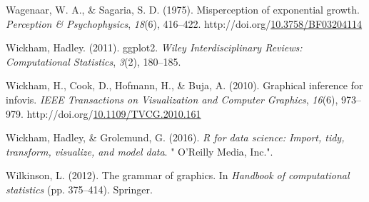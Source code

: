 \documentclass[print]{nuthesis}
\newlength{\cslhangindent}
\newenvironment{CSLReferences}%
{\setlength{\parindent}{0pt}%
\everypar{\setlength{\hangindent}{\cslhangindent}}\ignorespaces}%
{\par}
\begin{document}
\begin{CSLReferences}{1}{0}
\leavevmode\hypertarget{ref-wagenaar_misperception_1975}{}%
Wagenaar, W. A., \& Sagaria, S. D. (1975). Misperception of exponential growth. \emph{Perception \& Psychophysics}, \emph{18}(6), 416--422. http://doi.org/\href{https://doi.org/10.3758/BF03204114}{10.3758/BF03204114}

\leavevmode\hypertarget{ref-wickham2011ggplot2}{}%
Wickham, Hadley. (2011). ggplot2. \emph{Wiley Interdisciplinary Reviews: Computational Statistics}, \emph{3}(2), 180--185.

\leavevmode\hypertarget{ref-wickham_graphical_2010}{}%
Wickham, H., Cook, D., Hofmann, H., \& Buja, A. (2010). Graphical inference for infovis. \emph{IEEE Transactions on Visualization and Computer Graphics}, \emph{16}(6), 973--979. http://doi.org/\href{https://doi.org/10.1109/TVCG.2010.161}{10.1109/TVCG.2010.161}

\leavevmode\hypertarget{ref-wickham2016r}{}%
Wickham, Hadley, \& Grolemund, G. (2016). \emph{R for data science: Import, tidy, transform, visualize, and model data}. " O'Reilly Media, Inc.".

\leavevmode\hypertarget{ref-wilkinson2012grammar}{}%
Wilkinson, L. (2012). The grammar of graphics. In \emph{Handbook of computational statistics} (pp. 375--414). Springer.

\end{CSLReferences}


\backmatter

% 






\end{document}
